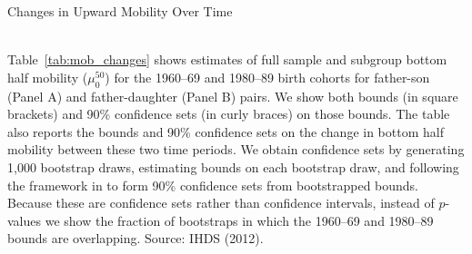 \begin{landscape}
\clearpage 
\pagestyle{fancy}
\markright{} 

\begin{table}
  \caption{Changes in Upward Mobility Over Time}
  \label{tab:mob_changes}
  \begin{center}
  \end{center}
\begin{center}
   
\end{center}
  \begin{center}
  \end{center}
\begin{center}
   
\end{center}
\\ 
\footnotesize{Table~\ref{tab:mob_changes} shows estimates of full
    sample and subgroup bottom half mobility ($\mu_0^{50}$) for the
    1960--69 and 1980--89 birth cohorts for father-son (Panel A) and
    father-daughter (Panel B) pairs. We show both bounds (in square
    brackets) and 90\% confidence sets (in curly braces) on those
    bounds. The table also reports the bounds and 90\% confidence sets
    on the change in bottom half mobility between these two time
    periods. We obtain confidence sets by generating 1,000 bootstrap
    draws, estimating bounds on each bootstrap draw, and following the
    framework in  to form 90\% confidence
    sets from bootstrapped bounds. Because these are
    confidence sets rather than confidence
    intervals, instead of $p$-values we show the fraction of bootstraps
    in which the 1960--69 and 1980--89 bounds are overlapping. Source:
    IHDS (2012).}
\end{table}
\end{landscape} 
\clearpage
\pagestyle{fancy}

